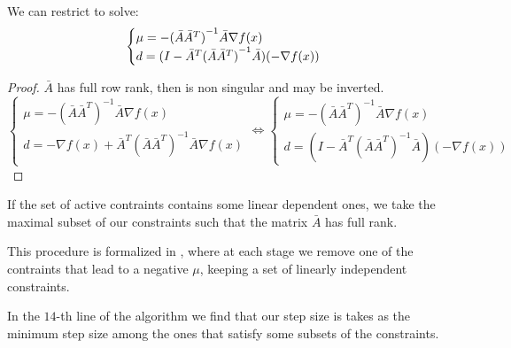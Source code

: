 \documentclass[ComputationalMathematics.tex]{subfiles}
\begin{document}
\begin{proposition}
We can restrict to solve:
  \[
  \begin{cases}
    \mu = - {(\bar{A}{\bar{A}}^{T})}^{-1}\bar{A}\nabla f(x)\\
    d = (I - {\bar{A}}^{T} {(\bar{A}{\bar{A}}^{T})}^{-1}\bar{A}) (- \nabla f(x))
  \end{cases}
  \]
\end{proposition}

\begin{proof}
$\bar{A}$ has full row rank, then is non singular and may be inverted.
  \[
  \begin{cases}
  \mu = - {(\bar{A} \bar{A}^T)}^{-1} \bar{A} \nabla f(x)\\
  d = - \nabla f(x) + \bar{A}^T {(\bar{A} \bar{A}^T)}^{-1} \bar{A} \nabla f(x)\\
  \end{cases}
  \iff
  \begin{cases}
  \mu = - {(\bar{A} \bar{A}^T)}^{-1} \bar{A} \nabla f(x)\\
  d = ( I - \bar{A}^T {(\bar{A} \bar{A}^T)}^{-1} \bar{A} ) (- \nabla f(x))
  \end{cases}
\]
\end{proof}

If the set of active contraints contains some linear dependent ones, we take the maximal subset of our constraints such that the matrix $\bar{A}$ has full rank.

This procedure is formalized in , where at each stage we remove one of the contraints that lead to a negative $\mu$, keeping a set of linearly independent constraints.

In the $14$-th line of the algorithm we find that our step size is takes as the minimum step size among the ones that satisfy some subsets of the constraints.

\end{document}
